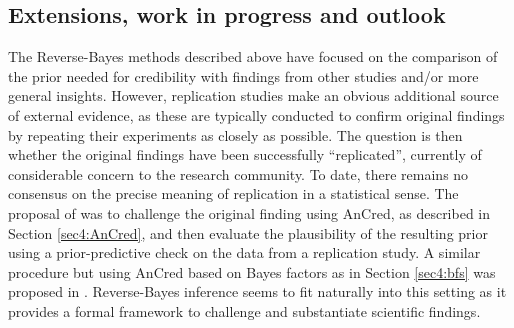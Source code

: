 \subsection{Extensions, work in progress and outlook}
\label{sec4:extensions}
The Reverse-Bayes methods described above have focused on the comparison of the
prior needed for credibility with findings from other studies and/or more
general insights. However, replication studies make an obvious additional source
of external evidence, as these are typically conducted to confirm original
findings by repeating their experiments as closely as possible. The question is
then whether the original findings have been successfully ``replicated'',
currently of considerable concern to the research community. To date, there
remains no consensus on the precise meaning of replication in a statistical
sense. The proposal of \citet{Held2020} \citep[see also][]{Held2021} was to
challenge the original finding using AnCred, as described in Section
\ref{sec4:AnCred}, and then evaluate the plausibility of the resulting prior
using a prior-predictive check on the data from a replication study. A similar
procedure but using AnCred based on Bayes factors as in Section \ref{sec4:bfs}
was proposed in \citet{Pawel2020b}. Reverse-Bayes inference seems to fit
naturally into this setting as it provides a formal framework to challenge and
substantiate scientific findings.


